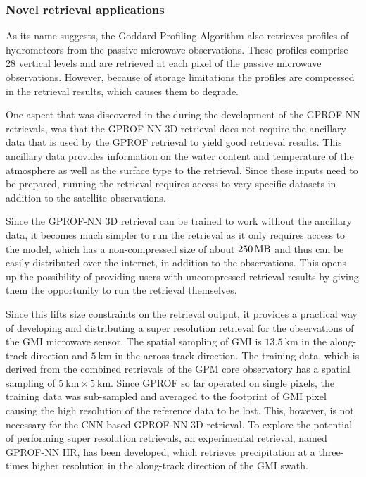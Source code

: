 \subsubsection{Novel retrieval applications}

As its name suggests, the Goddard Profiling Algorithm also retrieves profiles of
hydrometeors from the passive microwave observations. These profiles comprise 28
vertical levels and are retrieved at each pixel of the passive microwave
observations. However, because of storage limitations the profiles are
compressed in the retrieval results, which causes them to degrade.

One aspect that was discovered in the during the development of the GPROF-NN
retrievals, was that the GPROF-NN 3D retrieval does not require the ancillary
data that is used by the GPROF retrieval to yield good retrieval results. This
ancillary data provides information on the water content and temperature of the
atmosphere as well as the surface type to the retrieval. Since these inputs need
to be prepared, running the retrieval requires access to very specific datasets
in addition to the satellite observations.

Since the GPROF-NN 3D retrieval can be trained to work without the ancillary
data, it becomes much simpler to run the retrieval as it only requires access to
the model, which has a non-compressed size of about $\SI{250}{\mega \byte}$ and
thus can be easily distributed over the internet, in addition to the
observations. This opens up the possibility of providing users with uncompressed
retrieval results by giving them the opportunity to run the retrieval
themselves.

Since this lifts size constraints on the retrieval output, it provides a
practical way of developing and distributing a super resolution retrieval for
the observations of the GMI microwave sensor. The spatial sampling of GMI is
$\SI{13.5}{\kilo \meter}$ in the along-track direction and $\SI{5}{\kilo
  \meter}$ in the across-track direction. The training data, which is derived
from the combined retrievals of the GPM core observatory has a spatial sampling
of $\SI{5}{\kilo \meter} \times \SI{5}{\kilo \meter}$. Since GPROF so far
operated on single pixels, the training data was sub-sampled and averaged to the
footprint of GMI pixel causing the high resolution of the reference data to be
lost. This, however, is not necessary for the CNN based GPROF-NN 3D retrieval.
To explore the potential of performing super resolution retrievals, an
experimental retrieval, named GPROF-NN HR, has been developed, which retrieves
precipitation at a three-times higher resolution in the along-track direction of
the GMI swath.

